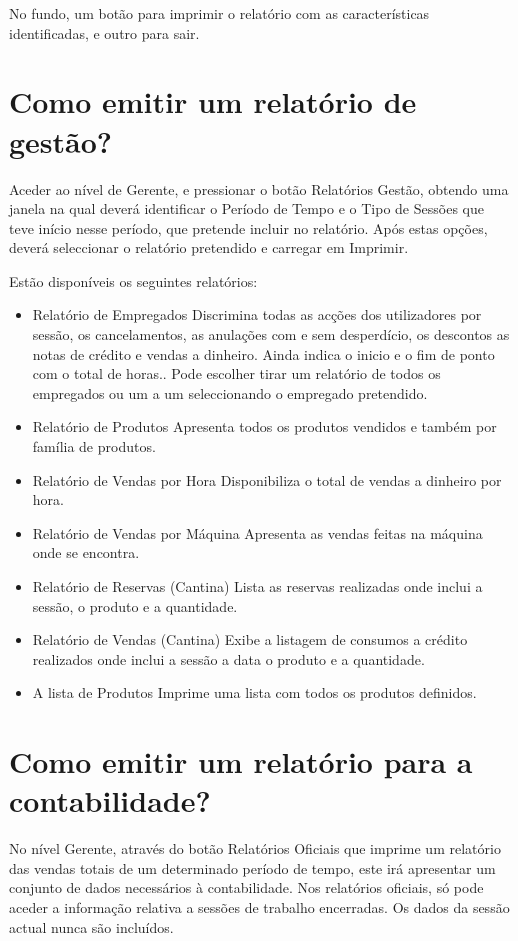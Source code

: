 \documentclass[a4paper,11pt,openany]{memoir}
\begin{document}
No fundo, um botão para imprimir o relatório com as características identificadas, e
outro para sair.

\section{Como emitir um relatório de gestão?}
Aceder ao nível de Gerente, e pressionar o botão Relatórios Gestão, obtendo uma
janela na qual deverá identificar o Período de Tempo e o Tipo de Sessões que teve
início nesse período, que pretende incluir no relatório. Após estas opções, deverá
seleccionar o relatório pretendido e carregar em Imprimir.

Estão disponíveis os seguintes relatórios:
\begin{itemize}
\item Relatório de Empregados
Discrimina todas as acções dos utilizadores por sessão, os
cancelamentos, as anulações com e sem desperdício, os descontos as notas
de crédito e vendas a dinheiro. Ainda indica o inicio e o fim de ponto com o
total de horas.. Pode escolher tirar um relatório de todos os empregados ou
um a um seleccionando o empregado pretendido.
\item  Relatório de Produtos
Apresenta todos os produtos vendidos e também por família de produtos.
\item  Relatório de Vendas por Hora
Disponibiliza o total de vendas a dinheiro por hora.
\item  Relatório de Vendas por Máquina
Apresenta as vendas feitas na máquina onde se encontra.
\item  Relatório de Reservas (Cantina)
Lista as reservas realizadas onde inclui a sessão, o produto e a quantidade.
\item  Relatório de Vendas (Cantina)
Exibe a listagem de consumos a crédito realizados onde inclui a sessão a
data o produto e a quantidade.
\item  A lista de Produtos
Imprime uma lista com todos os produtos definidos.
\end{itemize}

\section{Como emitir um relatório para a contabilidade?}
No nível Gerente, através do botão Relatórios Oficiais que imprime um relatório das
vendas totais de um determinado período de tempo, este irá apresentar um conjunto
de dados necessários à contabilidade. Nos relatórios oficiais, só pode aceder a
informação relativa a sessões de trabalho encerradas. Os dados da sessão actual
nunca são incluídos.
\end{document}
